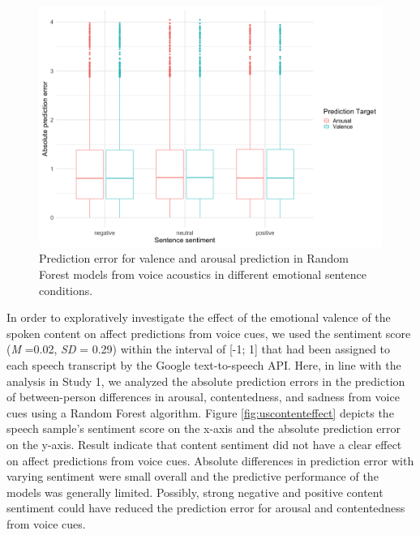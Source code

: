 \documentclass[
  man,floatsintext]{apa6}
\begin{document}
\begin{figure}

{\centering \includegraphics[width=1\linewidth]{../figures/predictions_condition_plot} 

}

\caption[Prediction error in different emotional sentence conditions]{Prediction error for valence and arousal prediction in Random Forest models from voice acoustics in different emotional sentence conditions.}\label{fig:gercontenteffect}
\end{figure}

In order to exploratively investigate the effect of the emotional valence of the spoken content on affect predictions from voice cues, we used the sentiment score (\emph{M} =0.02, \emph{SD} = 0.29) within the interval of {[}-1; 1{]} that had been assigned to each speech transcript by the Google text-to-speech API. Here, in line with the analysis in Study 1, we analyzed the absolute prediction errors in the prediction of between-person differences in arousal, contentedness, and sadness from voice cues using a Random Forest algorithm. Figure \ref{fig:uscontenteffect} depicts the speech sample's sentiment score on the x-axis and the absolute prediction error on the y-axis.
Result indicate that content sentiment did not have a clear effect on affect predictions from voice cues. Absolute differences in prediction error with varying sentiment were small overall and the predictive performance of the models was generally limited. Possibly, strong negative and positive content sentiment could have reduced the prediction error for arousal and contentedness from voice cues.
\end{document}
